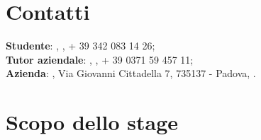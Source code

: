 \section{Contatti}
\textbf{Studente}: \myName, , + 39 342 083 14 26;\\
\textbf{Tutor aziendale}: \Greg, , + 39 0371 59 457 11;\\
\textbf{Azienda}: \myCompany, Via Giovanni Cittadella 7, 735137 - Padova, \sitoCompany.

\section{Scopo dello stage}

